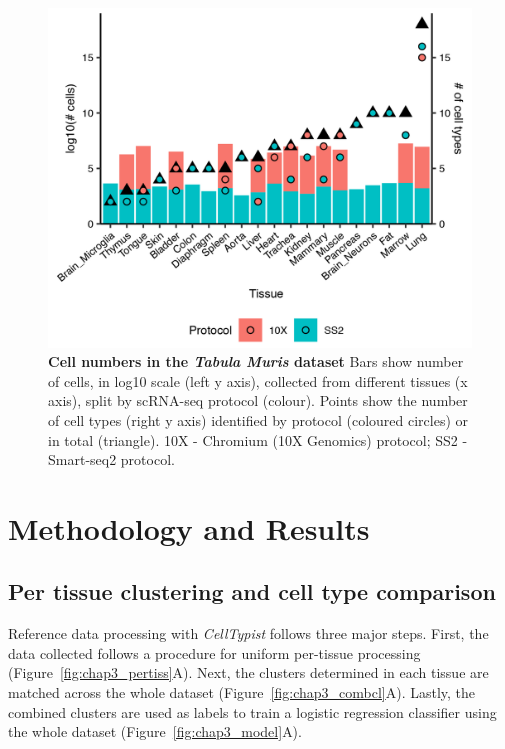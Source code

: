 \begin{figure}[ht!]
    \centering    
    \includegraphics[width=1.0\textwidth]{Chapter3/Figs/countsCTCells_TabulaMuris.png} %
    \caption[Cell numbers in the \textit{Tabula Muris} dataset]{\textbf{Cell numbers in the \textit{Tabula Muris} dataset} \newline Bars show number of cells, in log10 scale (left y axis), collected from different tissues (x axis), split by scRNA-seq protocol (colour). Points show the number of cell types (right y axis) identified by protocol (coloured circles) or in total (triangle). 10X - Chromium (10X Genomics) protocol; SS2 - Smart-seq2 protocol.}
    \label{fig:chap3_tmcounts}
\end{figure}



\section{Methodology and Results}
\label{section3.2}
\subsection{Per tissue clustering and cell type comparison}
\label{section3.2.1}
Reference data processing with \textit{CellTypist} follows three major steps. First, the data collected follows a procedure for uniform per-tissue processing (Figure~\ref{fig:chap3_pertiss}A). Next, the clusters determined in each tissue are matched across the whole dataset (Figure~\ref{fig:chap3_combcl}A). Lastly, the combined clusters are used as labels to train a logistic regression classifier using the whole dataset (Figure~\ref{fig:chap3_model}A).

